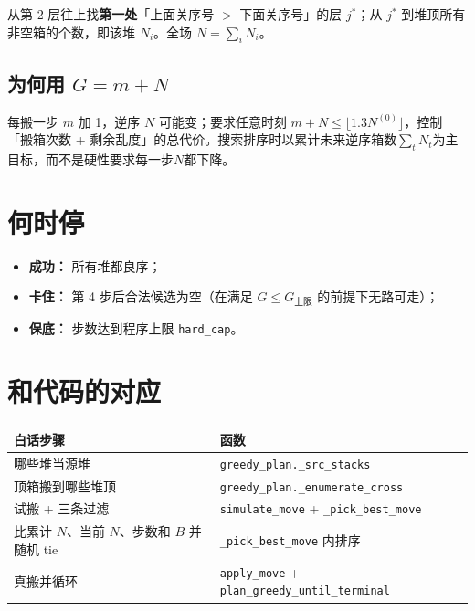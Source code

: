 \documentclass[11pt,a4paper]{ctexart}
\newcommand{\capG}{G_{\mathrm{上限}}}
\begin{document}
从第 2 层往上找\textbf{第一处}「上面关序号 $>$ 下面关序号」的层 $j^\ast$；从 $j^\ast$ 到堆顶所有非空箱的个数，即该堆 $N_i$。全场 $N=\sum_i N_i$。

\subsection{为何用 $G=m+N$}

每搬一步 $m$ 加 1，逆序 $N$ 可能变；要求任意时刻 $m+N \le \lfloor 1.3 N^{(0)}\rfloor$，控制「搬箱次数 + 剩余乱度」的总代价。搜索排序时以累计未来逆序箱数$\sum_t N_t$为主目标，而不是硬性要求每一步$N$都下降。

\section{何时停}

\begin{itemize}
  \item \textbf{成功：} 所有堆都良序；
  \item \textbf{卡住：} 第 4 步后合法候选为空（在满足 $G\le\capG$ 的前提下无路可走）；
  \item \textbf{保底：} 步数达到程序上限 \texttt{hard\_cap}。
\end{itemize}

\section{和代码的对应}

\begin{table}[h]
  \centering
  \begin{tabular}{p{5.5cm}p{6.5cm}}
    \toprule
    白话步骤 & 函数 \\
    \midrule
    哪些堆当源堆 & \texttt{greedy\_plan.\_src\_stacks} \\
    顶箱搬到哪些堆顶 & \texttt{greedy\_plan.\_enumerate\_cross} \\
    试搬 + 三条过滤 & \texttt{simulate\_move} + \texttt{\_pick\_best\_move} \\
    比累计 $N$、当前 $N$、步数和 $B$ 并随机 tie & \texttt{\_pick\_best\_move} 内排序 \\
    真搬并循环 & \texttt{apply\_move} + \texttt{plan\_greedy\_until\_terminal} \\
    \bottomrule
  \end{tabular}
\end{table}
\end{document}
